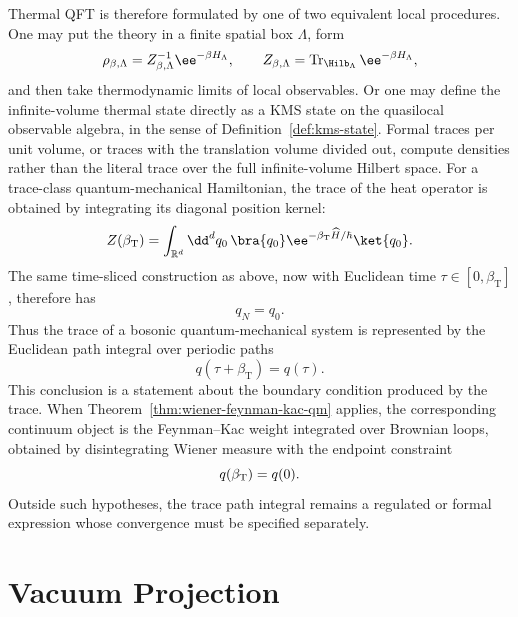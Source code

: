 Thermal QFT is therefore formulated by one of two equivalent local procedures.
One may put the theory in a finite spatial box \(\Lambda\), form
\[
  \rho_{\beta,\Lambda}
  =
  Z_{\beta,\Lambda}^{-1}\ee^{-\beta H_\Lambda},
  \qquad
  Z_{\beta,\Lambda}=\operatorname{Tr}_{\Hilb_\Lambda}\ee^{-\beta H_\Lambda},
\]
and then take thermodynamic limits of local observables.  Or one may define
the infinite-volume thermal state directly as a KMS state on the quasilocal
observable algebra, in the sense of
Definition~\ref{def:kms-state}.  Formal traces per unit volume, or traces with
the translation volume divided out, compute densities rather than the literal
trace over the full infinite-volume Hilbert space.
For a trace-class quantum-mechanical Hamiltonian, the trace of the heat
operator is obtained by integrating its diagonal position kernel:
\[
  Z(\beta_{\mathrm T})
  =
  \int_{\mathbb R^d}\dd^dq_0\,
  \bra{q_0}
  \ee^{-\beta_{\mathrm T}\widehat H/\hbar}
  \ket{q_0}.
\]
The same time-sliced construction as above, now with Euclidean time
\(\tau\in[0,\beta_{\mathrm T}]\), therefore has
\[
  q_N=q_0 .
\]
Thus the trace of a bosonic quantum-mechanical system is represented by the
Euclidean path integral over periodic paths
\[
  q(\tau+\beta_{\mathrm T})=q(\tau).
\]
This conclusion is a statement about the boundary condition produced by the
trace.  When Theorem~\ref{thm:wiener-feynman-kac-qm} applies, the
corresponding continuum object is the Feynman--Kac weight integrated over
Brownian loops, obtained by disintegrating Wiener measure with the endpoint
constraint
\[
  q(\beta_{\rm T})=q(0).
\]
Outside such hypotheses, the trace path integral remains a regulated or formal
expression whose convergence must be specified separately.

\section{Vacuum Projection}

